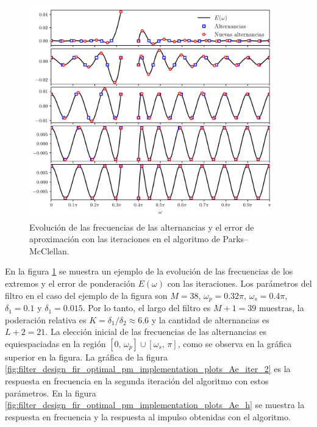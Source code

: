 \documentclass[a4paper]{report}
\begin{document}
\begin{figure}[!htb]
 \begin{center}
 \includegraphics[width=0.95\textwidth]{figuras/filter_design_fir_optimal_pm_implementation_plots_error.pdf}
 \caption{\label{fig:filter_design_fir_optimal_pm_implementation_plots_error} Evolución de las frecuencias de las alternancias y el error de aproximación con las iteraciones en el algoritmo de Parks--McClellan.}
 \end{center}
\end{figure}
En la figura \ref{fig:filter_design_fir_optimal_pm_implementation_plots_error} se muestra un ejemplo de la evolución de las frecuencias de los extremos y el error de ponderación \(E(\omega)\) con las iteraciones. Los parámetros del filtro en el caso del ejemplo de la figura son \(M=38\), \(\omega_p=0.32\pi\), \(\omega_s=0.4\pi\), \(\delta_1=0.1\) y \(\delta_1=0.015\). Por lo tanto, el largo del filtro es \(M+1=39\) muestras, la poderación relativa es \(K=\delta_1/\delta_2\approx6.6\) y la cantidad de alternancias es \(L+2=21\). La elección inicial de las frecuencias de las alternancias es equiespaciadas en la región \([0,\,\omega_p]\cup[\omega_s,\,\pi]\), como se observa en la gráfica superior en la figura. La gráfica de la figura \ref{fig:filter_design_fir_optimal_pm_implementation_plots_Ae_iter_2} es la respuesta en frecuencia en la segunda iteración del algoritmo con estos parámetros. En la figura \ref{fig:filter_design_fir_optimal_pm_implementation_plots_Ae_h} se muestra la respuesta en frecuencia y la respuesta al impulso obtenidas con el algoritmo.
\end{document}
